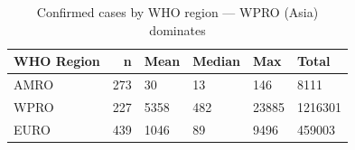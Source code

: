 \begin{table}[htbp]
\caption{Confirmed cases by WHO region — WPRO (Asia) dominates}
\label{tab:cases_region}
\begin{tabular}{lrllll}
\toprule
WHO Region & n & Mean & Median & Max & Total \\
\midrule
AMRO & 273 & 30 & 13 & 146 & 8111 \\
WPRO & 227 & 5358 & 482 & 23885 & 1216301 \\
EURO & 439 & 1046 & 89 & 9496 & 459003 \\
\bottomrule
\end{tabular}
\end{table}
